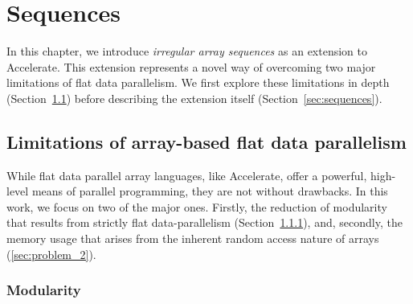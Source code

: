 \chapter{Sequences}
\label{chap:motivation}

In this chapter, we introduce \emph{irregular array sequences} as an extension to Accelerate. This extension represents a novel way of overcoming two major limitations of flat data parallelism. We first explore these limitations in depth (Section~\ref{sec:limitations}) before describing the extension itself (Section~\ref{sec:sequences}).




\section{Limitations of array-based flat data parallelism}
\label{sec:limitations}
While flat data parallel array languages, like Accelerate, offer a powerful, high-level means of parallel programming, they are not without drawbacks. In this work, we focus on two of the major ones. Firstly, the reduction of modularity that results from strictly flat data-parallelism (Section~\ref{sec:problem_1}), and, secondly, the memory usage that arises from the inherent random access nature of arrays (\ref{sec:problem_2}).

\subsection{Modularity}
\label{sec:problem_1}

